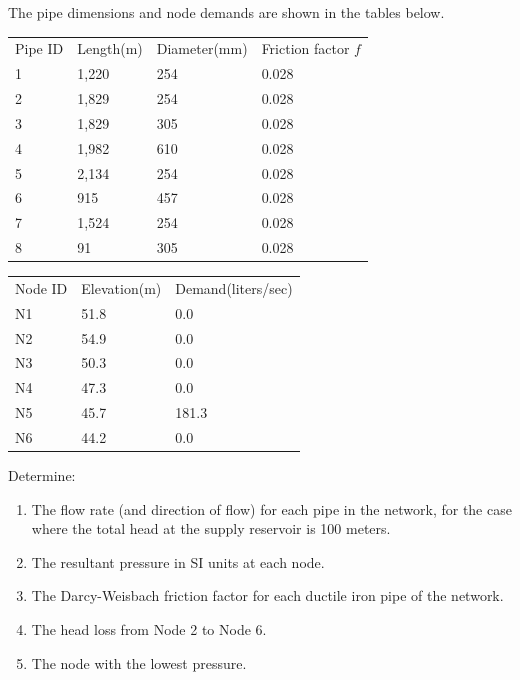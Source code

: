 \documentclass[12pt]{article}
\begin{document}
\begin{enumerate}
The pipe dimensions and node demands are shown in the tables below.

\begin{tabular}{p{1.0in}p{1.0in}p{1.0in}p{1.5in}}
Pipe ID&Length(m)&Diameter(mm)&Friction factor $f$\\
1&1,220&254&0.028\\
2&1,829&254&0.028\\
3&1,829&305&0.028\\
4&1,982&610&0.028\\
5&2,134&254&0.028\\
6&915&457&0.028\\
7&1,524&254&0.028\\
8&91&305&0.028\\
\end{tabular}

\begin{tabular}{p{1.0in}p{1.0in}p{1.0in}}
Node ID&Elevation(m)&Demand(liters/sec)\\
N1&51.8&0.0\\
N2&54.9&0.0\\
N3&50.3&0.0\\
N4&47.3&0.0\\
N5&45.7&181.3\\
N6&44.2&0.0\\
\end{tabular}

\clearpage

Determine:

\begin{enumerate}
\item The flow rate (and direction of flow) for each pipe in the network, for the case where the total head at the supply reservoir is 100 meters.
\item The resultant pressure in SI units at each node.
\item The Darcy-Weisbach friction factor for each ductile iron pipe of the network.
\item The head loss from Node 2 to Node 6.
\item The node with the lowest pressure.
\end{enumerate}

\clearpage

\end{enumerate}
\end{document}
